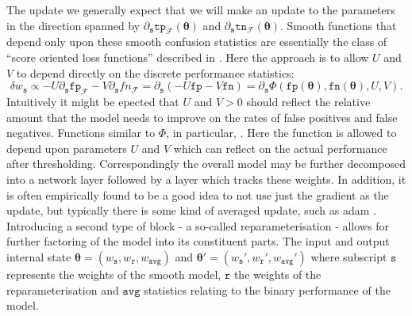 \documentclass[10pt,a4paper]{article}
\begin{document}
The update we generally expect that we will make an update to the parameters in the direction spanned by $\partial_\texttt{s}\texttt{tp}_{\mathcal F}(\boldsymbol\theta)$ and $\partial_\texttt{s}\texttt{tn}_{\mathcal F}(\boldsymbol\theta)$.
Smooth functions that depend only upon these smooth confusion statistics are essentially the class of ``score oriented loss functions'' described in \cite{marchetti2022score}.
Here the approach is to allow $U$ and $V$ to depend directly on the discrete performance statistics:
$$
\delta w_\texttt{s}\propto-U\partial_\texttt{s}\texttt{fp}_{\mathcal F}-V\partial_\texttt{s}{fn}_{\mathcal F}=\partial_\texttt{s}(-U\texttt{fp}-V\texttt{fn})=\partial_\texttt{s}\Phi(\texttt{fp}(\boldsymbol\theta),\texttt{fn}(\boldsymbol\theta),U,V).
$$
Intuitively it might be epected that $U$ and $V>0$ should reflect the relative amount that the model needs to improve on the rates of false positives and false negatives.
Functions similar to $\Phi$, in particular, .
Here the function is allowed to depend upon parameters $U$ and $V$ which can reflect on the actual performance after thresholding.
Correspondingly the overall model may be further decomposed into a network layer followed by a layer which tracks these weights.
In addition, it is often empirically found to be a good idea to not use just the gradient as the update, but typically there is some kind of averaged update, such as adam \cite{kingma2017adammethodstochasticoptimization}.
Introducing a second type of block - a so-called reparameterisation - allows for further factoring of the model into its constituent parts.
The input and output internal state $\boldsymbol\theta=(w_\texttt{s},w_\texttt{r},w_\texttt{avg})$ and $\boldsymbol\theta'=(w_\texttt{s}',w_\texttt{r}',w_\texttt{avg}')$ where subscript $\texttt{s}$ represents the weights of the smooth model, $\texttt{r}$ the weights of the reparameterisation and $\texttt{avg}$ statistics relating to the binary performance of the model.
\end{document}

